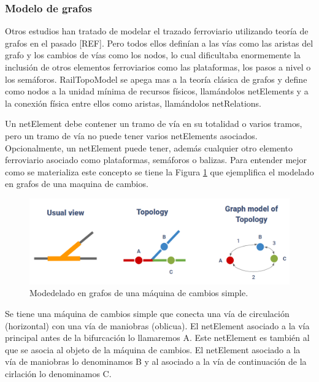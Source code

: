 \subsubsection{Modelo de grafos}
    \label{sec:RTM}
    
    Otros estudios han tratado de modelar el trazado ferroviario utilizando teoría de grafos en el pasado [REF]. Pero todos ellos definían a las vías como las aristas del grafo y los cambios de vías como los nodos, lo cual dificultaba enormemente la inclusión de otros elementos ferroviarios como las plataformas, los pasos a nivel o los semáforos. RailTopoModel se apega mas a la teoría clásica de grafos y define como nodos a la unidad mínima de recursos físicos, llamándolos netElements y a la conexión física entre ellos como aristas, llamándolos netRelations.

    Un netElement debe contener un tramo de vía en su totalidad o varios tramos, pero un tramo de vía no puede tener varios netElements asociados. Opcionalmente, un netElement puede tener, además cualquier otro elemento ferroviario asociado como plataformas, semáforos o balizas. Para entender mejor como se materializa este concepto se tiene la Figura \ref{fig:grafos_1} que ejemplifica el modelado en grafos de una maquina de cambios.

    \begin{figure}[!h]
        \centering
        \includegraphics[width=1\textwidth]{Figuras/grafos}
        \centering\caption{Modedelado en grafos de una máquina de cambios simple.}
        \label{fig:grafos_1}
    \end{figure}

    Se tiene una máquina de cambios simple que conecta una vía de circulación (horizontal) con una vía de maniobras (oblicua). El netElement asociado a la vía principal antes de la bifurcación lo llamaremos A. Este netElement es también al que se asocia al objeto de la máquina de cambios. El netElement asociado a la vía de maniobras lo denominamos B y al asociado a la vía de continuación de la cirlación lo denominamos C.

